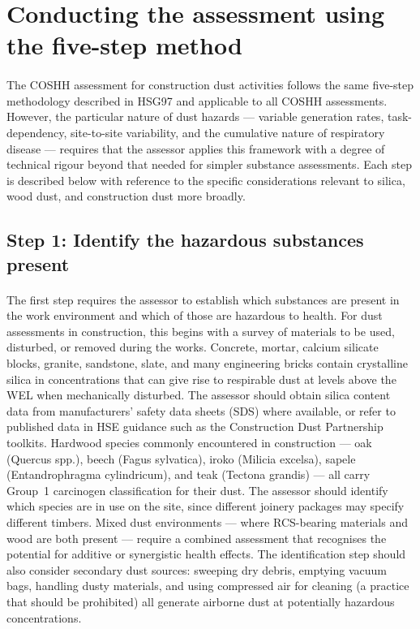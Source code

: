 \section{Conducting the assessment using the five-step method}

\paragraph{}
The COSHH assessment for construction dust activities follows the same five-step methodology described in HSG97 and applicable to all COSHH assessments. However, the particular nature of dust hazards --- variable generation rates, task-dependency, site-to-site variability, and the cumulative nature of respiratory disease --- requires that the assessor applies this framework with a degree of technical rigour beyond that needed for simpler substance assessments. Each step is described below with reference to the specific considerations relevant to silica, wood dust, and construction dust more broadly.

\subsection{Step 1: Identify the hazardous substances present}

\paragraph{}
The first step requires the assessor to establish which substances are present in the work environment and which of those are hazardous to health. For dust assessments in construction, this begins with a survey of materials to be used, disturbed, or removed during the works. Concrete, mortar, calcium silicate blocks, granite, sandstone, slate, and many engineering bricks contain crystalline silica in concentrations that can give rise to respirable dust at levels above the WEL when mechanically disturbed. The assessor should obtain silica content data from manufacturers' safety data sheets (SDS) where available, or refer to published data in HSE guidance such as the Construction Dust Partnership toolkits. Hardwood species commonly encountered in construction --- oak (Quercus spp.), beech (Fagus sylvatica), iroko (Milicia excelsa), sapele (Entandrophragma cylindricum), and teak (Tectona grandis) --- all carry Group~1 carcinogen classification for their dust. The assessor should identify which species are in use on the site, since different joinery packages may specify different timbers. Mixed dust environments --- where RCS-bearing materials and wood are both present --- require a combined assessment that recognises the potential for additive or synergistic health effects. The identification step should also consider secondary dust sources: sweeping dry debris, emptying vacuum bags, handling dusty materials, and using compressed air for cleaning (a practice that should be prohibited) all generate airborne dust at potentially hazardous concentrations.

